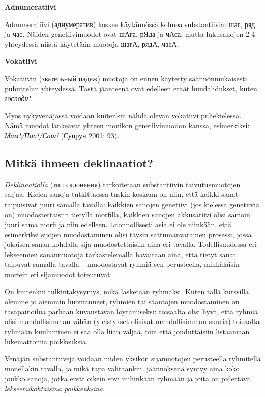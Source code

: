 \documentclass[]{scrartcl}
\begin{document}
\textbf{Adnumeratiivi}

Adnumeratiivi (аднумератив) koskee käytännössä kolmea substantiivia:
шаг, ряд ja час. Näiden genetiivimuodot ovat шАга, рЯда ja чАса, mutta
lukusanojen 2-4 yhteydessä niistä käytetään muotoja шагА, рядА, часА.

\textbf{Vokatiivi}

Vokatiivin (звательный падеж) muotoja on ennen käytetty
säännönmukaisesti puhuttelun yhteydessä. Tästä jäänteenä ovat edelleen
eräät huudahdukset, kuten \emph{господи!}.

Myös nykyvenäjässä voidaan kuitenkin nähdä olevan vokatiivi
puhekielessä. Nämä muodot lankeavat yhteen monikon genetiivimuodon
kanssa, esimerkiksi: \emph{Мам!/Пап!/Саш!} (Супрун 2001: 93).

\subsection{Mitkä ihmeen
deklinaatiot?}\label{mitkuxe4-ihmeen-deklinaatiot}

\emph{Deklinaatiolla} (тип склонения) tarkoitetaan substantiivin
taivutusmuotojen sarjaa. Kielen sanoja tutkittaessa tuskin koskaan on
niin, että kaikki sanat taipuisivat juuri samalla tavalla: kaikkien
sanojen genetiivi (jos kielessä genetiiviä on) muodostettaisiin tietyllä
morfilla, kaikkien sanojen akkusatiivi olisi samoin juuri sama morfi ja
niin edelleen. Luonnollisesti asia ei ole niinkään, että esimerkiksi
sijojen muodostaminen olisi täysin sattumanvarainen prosessi, jossa
jokaisen sanan kohdalla sija muodostettaisiin aina eri tavalla.
Todellisuudessa eri lekseemien sananmuotoja tarkastelemalla havaitaan
aina, että tietyt sanat taipuvat samalla tavalla -- muodostavat ryhmiä
sen perusteella, minkälaisin morfein eri sijamuodot toteutuvat.

On kuitenkin tulkintakysymys, mikä lasketaan ryhmäksi. Kuten tällä
kurssilla olemme jo aiemmin huomanneet, ryhmien tai sääntöjen
muodostaminen on tasapainoilua parhaan kuvaustavan löytämiseksi:
toisaalta olisi hyvä, että ryhmiä olisi mahdollisimman vähän
(yleistykset olisivat mahdollisimman suuria) toisaalta ryhmään
kuuluminen ei saa olla liian väljää, niin että jouduttaisiin listaamaan
lukemattomia poikkeuksia.

Venäjän substantiiveja voidaan niiden yksikön sijamuotojen perusteella
ryhmitellä monellakin tavalla, ja mikä tapa valitaankin, jäännöksenä
syntyy aina koko joukko sanoja, jotka eivät oikein sovi mihinkään
ryhmään ja joita on pidettävä \emph{lekseemikohtaisina poikkeuksina}.
\end{document}
